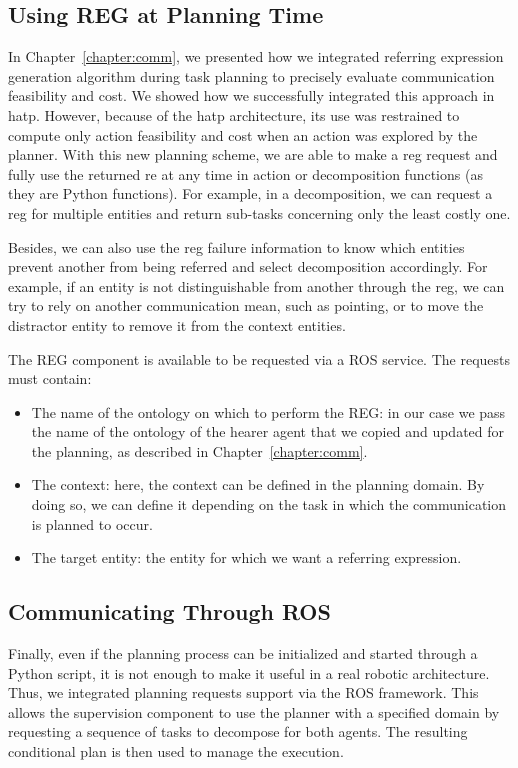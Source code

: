 \documentclass[a4paper,11pt,twoside]{StyleThese}
\begin{document}
\subsection{Using REG at Planning Time}
In Chapter~\ref{chapter:comm}, we presented how we integrated referring expression generation algorithm during task planning to precisely evaluate communication feasibility and cost. We showed how we successfully integrated this approach in \acrshort{hatp}. However, because of the \acrshort{hatp} architecture, its use was restrained to compute only action feasibility and cost when an action was explored by the planner.
With this new planning scheme, we are able to make a \acrshort{reg} request and fully use the returned \acrshort{re} at any time in action or decomposition functions (as they are Python functions). For example, in a decomposition, we can request a \acrshort{reg} for multiple entities and return sub-tasks concerning only the least costly one. 

Besides, we can also use the \acrshort{reg} failure information to know which entities prevent another from being referred and select decomposition accordingly. For example, if an entity is not distinguishable from another through the \acrshort{reg}, we can try to rely on another communication mean, such as pointing, or to move the distractor entity to remove it from the context entities.

The REG component is available to be requested via a ROS service. The requests must contain:
\begin{itemize}
\item The name of the ontology on which to perform the REG: in our case we pass the name of the ontology of the hearer agent that we copied and updated for the planning, as described in Chapter~\ref{chapter:comm}.

\item The context: here, the context can be defined in the planning domain. By doing so, we can define it depending on the task in which the communication is planned to occur.

\item The target entity: the entity for which we want a referring expression.
\end{itemize}

\subsection{Communicating Through ROS}
Finally, even if the planning process can be initialized and started through a Python script, it is not enough to make it useful in a real robotic architecture. Thus, we integrated planning requests support via the ROS framework. This allows the supervision component to use the planner with a specified domain by requesting a sequence of tasks to decompose for both agents. The resulting conditional plan is then used to manage the execution.
\end{document}
